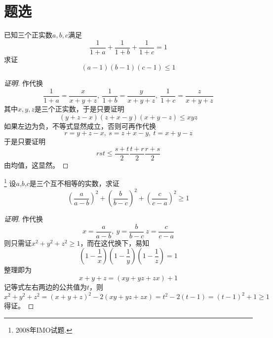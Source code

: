 
\section{题选}
\label{sec:inequality-exercises}

\begin{exercise}
  已知三个正实数$a,b,c$满足
  \begin{equation*}
    \frac{1}{1+a} + \frac{1}{1+b} + \frac{1}{1+c} = 1
  \end{equation*}
  求证
  \begin{equation*}
    (a-1)(b-1)(c-1) \leqslant 1
  \end{equation*}
\end{exercise}

\begin{proof}[证明]
  作代换
  \begin{equation*}
    \frac{1}{1+a} = \frac{x}{x+y+z}, \  \frac{1}{1+b} = \frac{y}{x+y+z}, \  \frac{1}{1+c} = \frac{z}{x+y+z}
  \end{equation*}
  其中$x,y,z$是三个正实数，于是只要证明
  \begin{equation*}
    (y+z-x)(z+x-y)(x+y-z) \leqslant xyz
  \end{equation*}
  如果左边为负，不等式显然成立，否则可再作代换
  \begin{equation*}
    r = y+z-x, \  s = z+x-y, \  t = x+y-z
  \end{equation*}
  于是只要证明
  \begin{equation*}
    rst \leqslant \frac{s+t}{2} \frac{t+r}{2} \frac{r+s}{2}
  \end{equation*}
  由均值，这显然。
\end{proof}

\begin{exercise}\footnote{2008年IMO试题.}
  设$a$,$b$,$c$是三个互不相等的实数，求证
  \[ \left( \frac{a}{a-b} \right)^2 + \left( \frac{b}{b-c} \right)^2 + \left( \frac{c}{c-a} \right)^2 \geqslant 1 \]
\end{exercise}

\begin{proof}[证明]
  作代换
  \[ x=\frac{a}{a-b}, \  y=\frac{b}{b-c} \  z=\frac{c}{c-a} \]
  则只需证$x^2+y^2+z^2 \geqslant 1$，而在这代换下，易知
  \[ \left( 1-\frac{1}{x} \right) \left( 1-\frac{1}{y} \right) \left( 1-\frac{1}{z} \right) = 1 \]
  整理即为
  \[ x+y+z = (xy+yz+zx)+1 \]
  记等式左右两边的公共值为$t$，则
    \[ x^2+y^2+z^2 = (x+y+z)^2-2(xy+yz+zx) = t^2-2(t-1)=(t-1)^2+1 \geqslant 1 \]
  得证。
\end{proof}

